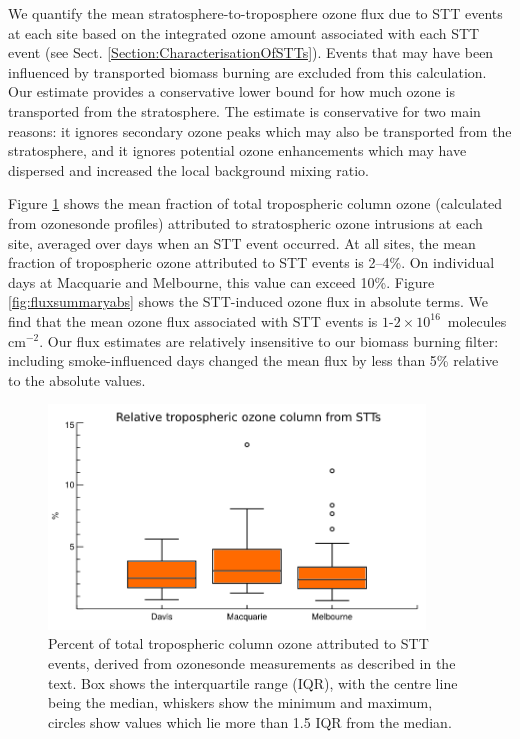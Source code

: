 \documentclass[acp, manuscript]{copernicus} %
\begin{document}
  We quantify the mean stratosphere-to-troposphere ozone flux due to STT events at each site based on the integrated ozone amount associated with each STT event (see Sect. \ref{Section:CharacterisationOfSTTs}).
  Events that may have been influenced by transported biomass burning are excluded from this calculation.
  Our estimate provides a conservative lower bound for how much ozone is transported from the stratosphere.
  The estimate is conservative for two main reasons: it ignores secondary ozone peaks which may also be transported from the stratosphere, and it ignores potential ozone enhancements which may have dispersed and increased the local background mixing ratio.

  Figure \ref{fig:fluxsummary} shows the mean fraction of total tropospheric column ozone (calculated from ozonesonde profiles) attributed to stratospheric ozone intrusions at each site, averaged over days when an STT event occurred.
  At all sites, the mean fraction of tropospheric ozone attributed to STT events is 2--4\%. On individual days at Macquarie and Melbourne, this value can exceed 10\%.
  Figure \ref{fig:fluxsummaryabs} shows the STT-induced ozone flux in absolute terms.
  We find that the mean ozone flux associated with STT events is $1$-$2 \times 10^{16}$~molecules cm$^{-2}$.
  Our flux estimates are relatively insensitive to our biomass burning filter: including smoke-influenced days changed the mean flux by less than 5\% relative to the absolute values.

  \begin{figure}[t]
    \includegraphics[width=10cm]{figures/flux_relative.png}
    \caption{%
      Percent of total tropospheric column ozone attributed to STT events, derived from ozonesonde measurements as described in the text.
      Box shows the interquartile range (IQR), with the centre line being the median, whiskers show the minimum and maximum, circles show values which lie more than 1.5 IQR from the median.}
    \label{fig:fluxsummary}
  \end{figure}
\end{document}
